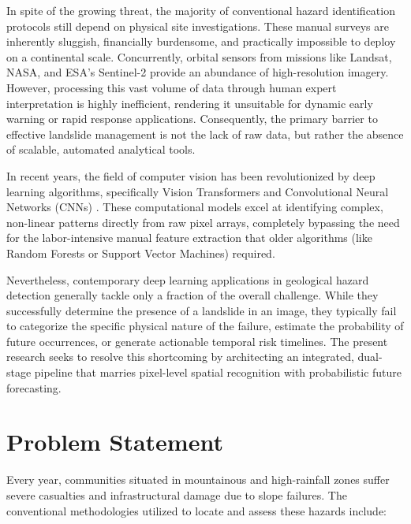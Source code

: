 \documentclass[12pt,a4paper]{report}
\begin{document}
In spite of the growing threat, the majority of conventional hazard identification protocols still depend on physical site investigations. These manual surveys are inherently sluggish, financially burdensome, and practically impossible to deploy on a continental scale. Concurrently, orbital sensors from missions like Landsat, NASA, and ESA's Sentinel-2 provide an abundance of high-resolution imagery. However, processing this vast volume of data through human expert interpretation is highly inefficient, rendering it unsuitable for dynamic early warning or rapid response applications. Consequently, the primary barrier to effective landslide management is not the lack of raw data, but rather the absence of scalable, automated analytical tools.

In recent years, the field of computer vision has been revolutionized by deep learning algorithms, specifically Vision Transformers and Convolutional Neural Networks (CNNs) \cite{he2016resnet, dosovitskiy2020vit}. These computational models excel at identifying complex, non-linear patterns directly from raw pixel arrays, completely bypassing the need for the labor-intensive manual feature extraction that older algorithms (like Random Forests or Support Vector Machines) required.

Nevertheless, contemporary deep learning applications in geological hazard detection generally tackle only a fraction of the overall challenge. While they successfully determine the presence of a landslide in an image, they typically fail to categorize the specific physical nature of the failure, estimate the probability of future occurrences, or generate actionable temporal risk timelines. The present research seeks to resolve this shortcoming by architecting an integrated, dual-stage pipeline that marries pixel-level spatial recognition with probabilistic future forecasting.

\section{Problem Statement}
Every year, communities situated in mountainous and high-rainfall zones suffer severe casualties and infrastructural damage due to slope failures. The conventional methodologies utilized to locate and assess these hazards include:
\end{document}
